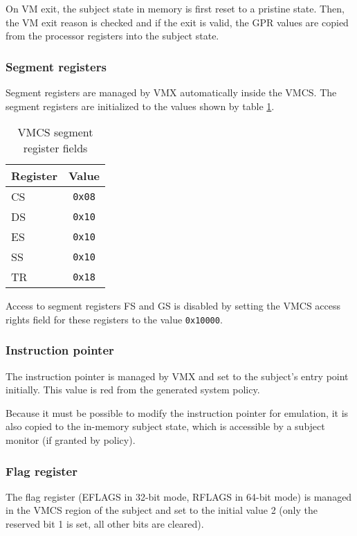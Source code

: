 On VM exit, the subject state in memory is first reset to a pristine state.
Then, the VM exit reason is checked and if the exit is valid, the GPR values are
copied from the processor registers into the subject state.

\subsubsection{Segment registers}
Segment registers are managed by VMX automatically inside the VMCS. The segment
registers are initialized to the values shown by table
\ref{tab:vmcs-segment-regs}.

\begin{table}[h]
	\centering
	\begin{tabular}{l|c}
		\textbf{Register} & \textbf{Value} \\
		\hline
		CS & \texttt{0x08} \\
		DS & \texttt{0x10} \\
		ES & \texttt{0x10} \\
		SS & \texttt{0x10} \\
		TR & \texttt{0x18} \\
		\hline
	\end{tabular}
	\caption{VMCS segment register fields}
	\label{tab:vmcs-segment-regs}
\end{table}

Access to segment registers FS and GS is disabled by setting the VMCS access
rights field for these registers to the value \texttt{0x10000}.

\subsubsection{Instruction pointer}
The instruction pointer is managed by VMX and set to the subject's entry point
initially. This value is red from the generated system policy.

Because it must be possible to modify the instruction pointer for emulation, it
is also copied to the in-memory subject state, which is accessible by a subject
monitor (if granted by policy).

\subsubsection{Flag register}
The flag register (EFLAGS in 32-bit mode, RFLAGS in 64-bit mode) is managed in
the VMCS region of the subject and set to the initial value 2 (only the reserved
bit 1 is set, all other bits are cleared).

